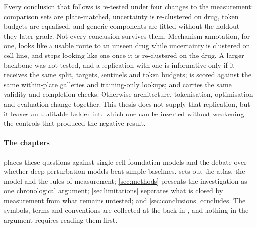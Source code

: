 Every conclusion that follows is re-tested under four changes to the
measurement: comparison sets are plate-matched, uncertainty is re-clustered on
drug, token budgets are equalised, and generic components are fitted without the
holdout they later grade. Not every conclusion survives them. Mechanism
annotation, for one, looks like a usable route to an unseen drug while
uncertainty is clustered on cell line, and stops looking like one once it is
re-clustered on the drug. A larger backbone was not tested, and a replication
with one is informative only if it receives the same split, targets, sentinels
and token budgets; is scored against the same
within-plate galleries and training-only lookups; and carries the same validity
and completion checks. Otherwise architecture, tokenisation, optimisation and
evaluation change together. This thesis does not supply that replication, but it
leaves an auditable ladder into which one can be inserted without weakening the
controls that produced the negative result.

\paragraph{The chapters}  places these questions against
single-cell foundation models and the debate over whether deep perturbation
models beat simple baselines.  sets out the atlas, the
model and the rules of measurement; \cref{sec:methods} presents the investigation
as one chronological argument; \cref{sec:limitations} separates what is closed by
measurement from what remains untested; and \cref{sec:conclusions} concludes. The
symbols, terms and conventions are collected at the back in ,
and nothing in the argument requires reading them first.
